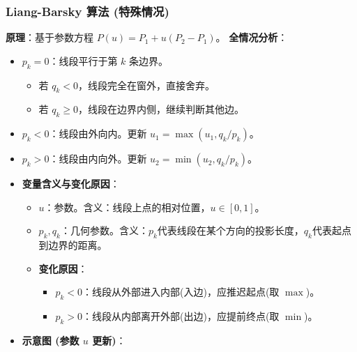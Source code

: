 \documentclass[UTF8]{ctexart}
\begin{document}
\subsubsection{Liang-Barsky 算法 (特殊情况)}
\textbf{原理}：基于参数方程 $P(u) = P_1 + u(P_2 - P_1)$。
\textbf{全情况分析}：
\begin{itemize}
    \item $p_k = 0$：线段平行于第 $k$ 条边界。
        \begin{itemize}
            \item 若 $q_k < 0$，线段完全在窗外，直接舍弃。
            \item 若 $q_k \ge 0$，线段在边界内侧，继续判断其他边。
        \end{itemize}
    \item $p_k < 0$：线段由外向内。更新 $u_1 = \max(u_1, q_k/p_k)$。
    \item $p_k > 0$：线段由内向外。更新 $u_2 = \min(u_2, q_k/p_k)$。
    \item \textbf{变量含义与变化原因}：
    \begin{itemize}
        \item $u$：参数。含义：线段上点的相对位置，$u \in [0,1]$。
        \item $p_k, q_k$：几何参数。含义：$p_k$代表线段在某个方向的投影长度，$q_k$代表起点到边界的距离。
        \item \textbf{变化原因}：
            \begin{itemize}
                \item $p_k < 0$：线段从外部进入内部(入边)，应推迟起点(取 $\max$)。
                \item $p_k > 0$：线段从内部离开外部(出边)，应提前终点(取 $\min$)。
            \end{itemize}
    \end{itemize}
    \item \textbf{示意图 (参数 $u$ 更新)}：
    \begin{center}
    \end{center}
\end{itemize}
\end{document}
